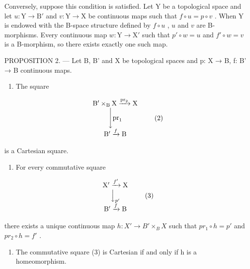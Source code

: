 Conversely, suppose this condition is satisfied. Let Y be a topological space and let \(u \colon \mathrm{Y} \to \mathrm{B}'\) and \(v \colon \mathrm{Y} \to \mathrm{X}\) be continuous maps such that \(f \circ u = p \circ v\) . When Y is endowed with the B-space structure defined by \(f \circ u\) , \(u\) and \(v\) are B-morphisms. Every continuous map \(w \colon \mathrm{Y} \to \mathrm{X}'\) such that \(p' \circ w = u\) and \(f' \circ w = v\) is a B-morphism, so there exists exactly one such map.

PROPOSITION 2. --- Let B, B' and X be topological spaces and p: X → B, f: B' → B continuous maps.

\begin{enumerate}
\def\labelenumi{\alph{enumi})}
\tightlist
\item
  The square
\end{enumerate}

\[
\begin{array}{c} \mathrm{B} ^ {\prime} \times_ {\mathrm{B}} \mathrm{X} \xrightarrow {\mathrm{pr} _ {2}} \mathrm{X} \\ \Biggl \downarrow \mathrm{pr} _ {1} \\ \mathrm{B} ^ {\prime} \xrightarrow {f} \mathrm{B} \end{array}\tag{2}
\]

is a Cartesian square.

\begin{enumerate}
\def\labelenumi{\alph{enumi})}
\setcounter{enumi}{1}
\tightlist
\item
  For every commutative square
\end{enumerate}

\[
\begin{array}{c} \mathrm {X^ {\prime}} \xrightarrow {f ^ {\prime}} \mathrm{X} \\ \Big \downarrow_ {p ^ {\prime}} \\ \mathrm {B^ {\prime}} \xrightarrow {f} \mathrm{B} \end{array}\tag{3}
\]

there exists a unique continuous map \(h: X' \to B' \times_{B} X\) such that \(pr_{1} \circ h = p'\) and \(pr_{2} \circ h = f'\) .

\begin{enumerate}
\def\labelenumi{\alph{enumi})}
\setcounter{enumi}{2}
\tightlist
\item
  The commutative square (3) is Cartesian if and only if h is a homeomorphism.
\end{enumerate}

